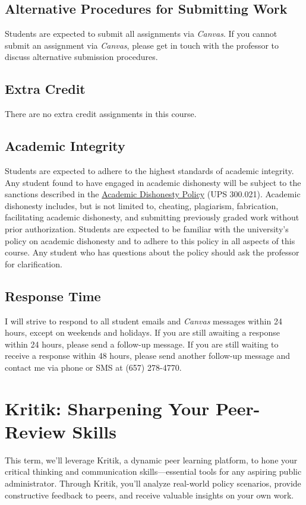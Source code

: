 \documentclass[10pt, letterpaper]{article}
\begin{document}
\subsection*{Alternative Procedures for Submitting Work}
Students are expected to submit all assignments via \emph{Canvas}. If you cannot submit an assignment via \emph{Canvas}, please get in touch with the professor to discuss alternative submission procedures.

\subsection*{Extra Credit}
There are no extra credit assignments in this course. 

\subsection*{Academic Integrity}
Students are expected to adhere to the highest standards of academic integrity. Any student found to have engaged in academic dishonesty will be subject to the sanctions described in the \href{https://www.fullerton.edu/senate/publications_policies_resolutions/ups/UPS%20300/UPS%20300.021.pdf}{Academic Dishonesty Policy} (UPS 300.021). Academic dishonesty includes, but is not limited to, cheating, plagiarism, fabrication, facilitating academic dishonesty, and submitting previously graded work without prior authorization. Students are expected to be familiar with the university's policy on academic dishonesty and to adhere to this policy in all aspects of this course. Any student who has questions about the policy should ask the professor for clarification.


\subsection*{Response Time} I will strive to respond to all student emails and \emph{Canvas} messages within 24 hours, except on weekends and holidays. If you are still awaiting a response within 24 hours, please send a follow-up message. If you are still waiting to receive a response within 48 hours, please send another follow-up message and contact me via phone or SMS at (657) 278-4770.


\section*{Kritik: Sharpening Your Peer-Review Skills}

This term, we'll leverage Kritik, a dynamic peer learning platform, to hone your critical thinking and communication skills—essential tools for any aspiring public administrator. Through Kritik, you'll analyze real-world policy scenarios, provide constructive feedback to peers, and receive valuable insights on your own work.
\end{document}
